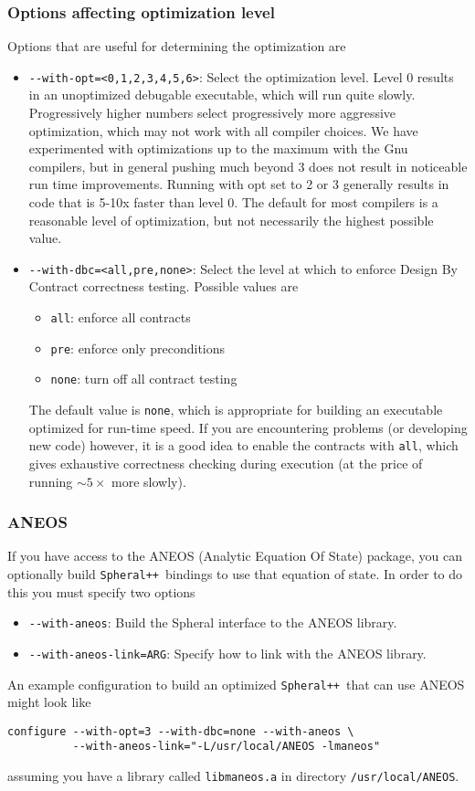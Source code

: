 \documentclass{article}
\newcommand{\Spheral}{{\tt Spheral++}}
\begin{document}
\subsubsection{Options affecting optimization level}
Options that are useful for determining the optimization are
\begin{itemize}
\item \verb+--with-opt=<0,1,2,3,4,5,6>+: Select the optimization level.  Level 0 results in an unoptimized debugable executable, which will run quite slowly.  Progressively higher numbers select progressively more aggressive optimization, which may not work with all compiler choices.  We have experimented with optimizations up to the maximum with the Gnu compilers, but in general pushing much beyond 3 does not result in noticeable run time improvements.  Running with opt set to 2 or 3 generally results in code that is 5-10x faster than level 0.  The default for most compilers is a reasonable level of optimization, but not necessarily the highest possible value.
\item \verb+--with-dbc=<all,pre,none>+: Select the level at which to enforce Design By Contract correctness testing.  Possible values are
\begin{itemize}
\item \verb+all+: enforce all contracts
\item \verb+pre+: enforce only preconditions
\item \verb+none+: turn off all contract testing
\end{itemize}
The default value is \verb+none+, which is appropriate for building an executable optimized for run-time speed.  If you are encountering problems (or developing new code) however, it is a good idea to enable the contracts with \verb+all+, which gives exhaustive correctness checking during execution (at the price of running $\sim 5\times$ more slowly).
\end{itemize}

\subsubsection{ANEOS}
If you have access to the ANEOS (Analytic Equation Of State) package, you can optionally build \Spheral\ bindings to use that equation of state.  In order to do this you must specify two options
\begin{itemize}
\item \verb+--with-aneos+: Build the Spheral interface to the ANEOS library.
\item \verb+--with-aneos-link=ARG+: Specify how to link with the ANEOS library.
\end{itemize}
An example configuration to build an optimized \Spheral\ that can use ANEOS might look like
\begin{verbatim}
configure --with-opt=3 --with-dbc=none --with-aneos \
          --with-aneos-link="-L/usr/local/ANEOS -lmaneos"
\end{verbatim}
assuming you have a library called \verb+libmaneos.a+ in directory \verb+/usr/local/ANEOS+.
\end{document}
